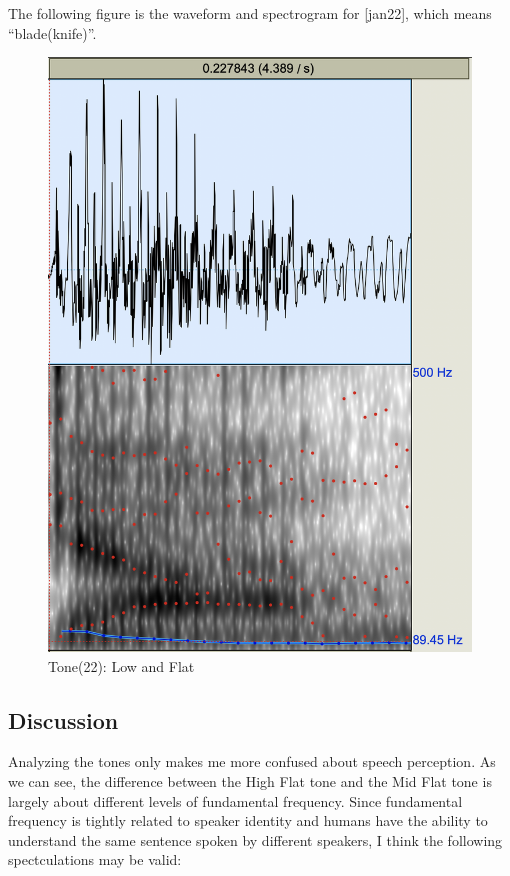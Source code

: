 \documentclass[a4paper]{article}
\begin{document}
The following figure is the waveform and spectrogram for [jan22], which means ``blade(knife)''.
\begin{figure}[H]
    \centering
    \includegraphics[scale=0.4]{imgs/tone22.png}
    \caption{Tone(22): Low and Flat}
\end{figure}

\subsection{Discussion}
Analyzing the tones only makes me more confused about speech perception. As we can see, the difference between the High Flat tone and the Mid Flat tone is largely about different levels of fundamental frequency. Since fundamental frequency is tightly related to speaker identity and humans have the ability to understand the same sentence spoken by different speakers, I think the following spectculations may be valid:
\end{document}
